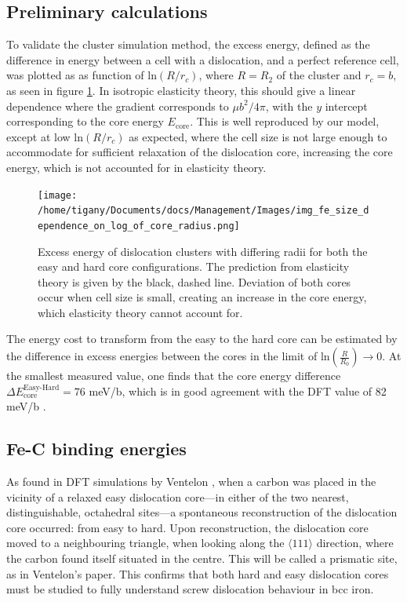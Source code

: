 \documentclass[a4paper,11pt]{article}
\begin{document}
\subsection{Preliminary calculations}
\label{sec:org2e37a67}


To validate the cluster simulation method, the excess energy, defined as the difference in energy
between a cell with a dislocation, and a perfect reference cell, was plotted as as function of
\(\text{ln}(R/r_c)\), where \(R = R_2\) of the cluster and \(r_c = b\), as seen in
figure \ref{lnrdep}. In isotropic elasticity theory, this should give a linear dependence where the gradient
corresponds to \(\mu b^2 / 4\pi\), with the \(y\) intercept corresponding to the
core energy \(E_{\text{core}}\). This is well reproduced by our model, except at low \(\text{ln}(R/r_c)\)
as expected, where the cell size is not large enough to accommodate for sufficient relaxation of
the dislocation core, increasing the core energy, which is not accounted for in elasticity theory.


\begin{figure}[htbp]
\centering
\texttt{[image: /home/tigany/Documents/docs/Management/Images/img\_fe\_size\_dependence\_on\_log\_of\_core\_radius.png]}
\caption{Excess energy of dislocation clusters with differing radii for both the easy and hard core configurations. The prediction from elasticity theory is given by the black, dashed line. Deviation of both cores occur when cell size is small, creating an increase in the core energy, which elasticity theory cannot account for. \label{lnrdep}}
\end{figure}




The energy cost to transform from the easy to the hard core can be estimated by
the difference in excess energies between the cores in the limit of
\(\text{ln}(\frac{R}{R_0}) \rightarrow 0\). At the smallest measured value, one finds that the core energy
difference \(\Delta E_{\text{core}}^{\text{Easy-Hard}} = 76\) meV/b, which is in good agreement with the DFT
value of 82 meV/b \cite{Itakura2012}.



\subsection{Fe-C binding energies}
\label{sec:org182063c}



As found in DFT simulations by Ventelon \cite{Ventelon2015}, when a carbon was placed in the
vicinity of a relaxed easy dislocation core---in either of the two nearest, distinguishable,
octahedral sites---a spontaneous reconstruction of the dislocation core occurred: from easy to
hard. Upon reconstruction, the dislocation core moved to a neighbouring triangle, when looking
along the \(\langle 111\rangle\) direction, where the carbon found itself situated in the centre. This will be
called a prismatic site, as in Ventelon's paper. This confirms that both hard and easy
dislocation cores must be studied to fully understand screw dislocation behaviour in bcc iron.
\end{document}
